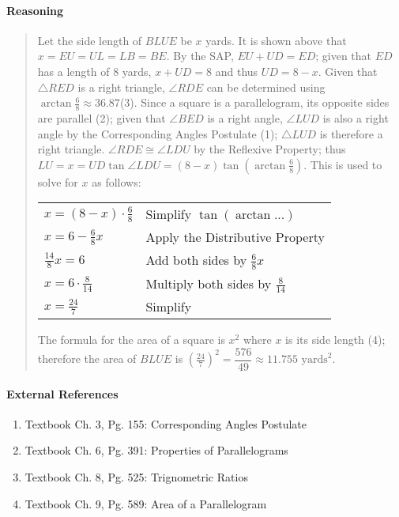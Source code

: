 \documentclass[letterpaper,12pt,twoside]{report}
\begin{document}
	\paragraph{Reasoning}
	\begin{quotation}
		
		Let the side length of $BLUE$ be $x$ yards. It is shown above that $x=EU=UL=LB=BE$. By the SAP, $EU+UD=ED$; given that $ED$ has a length of 8 yards, $x+UD=8$ and thus $UD=8-x$. Given that $\triangle RED$ is a right triangle, $\angle RDE$ can be determined using $\arctan \frac{6}{8} \approx 36.87$\textdegree (3). Since a square is a parallelogram, its opposite sides are parallel (2); given that $\angle BED$ is a right angle, $\angle LUD$ is also a right angle by the Corresponding Angles Postulate (1); $\triangle LUD$ is therefore a right triangle. $\angle RDE \cong \angle LDU$ by the Reflexive Property; thus $LU=x=UD \tan \angle LDU=(8-x)\tan (\arctan \frac{6}{8})$. This is used to solve for $x$ as follows:
		
		\begin{center}
			\begin{tabular}{l | l}
				$x=(8-x) \cdot \frac{6}{8}$ & Simplify $\tan(\arctan ...)$ \\
				$x=6-\frac{6}{8}x$ & Apply the Distributive Property \\
				$\frac{14}{8}x=6$ & Add both sides by $\frac{6}{8}x$ \\
				$x=6 \cdot \frac{8}{14}$ & Multiply both sides by $\frac{8}{14}$ \\
				$x=\frac{24}{7}$ & Simplify
			\end{tabular}
		\end{center}
		
		The formula for the area of a square is $x^2$ where $x$ is its side length (4); therefore the area of $BLUE$ is $(\frac{24}{7})^2=\boxed{\dfrac{576}{49} \approx 11.755 \text{  yards}^2}$.
	\end{quotation}
	
	\paragraph{External References}
	
	\begin{enumerate}
		\item Textbook Ch. 3, Pg. 155: Corresponding Angles Postulate
		\item Textbook Ch. 6, Pg. 391: Properties of Parallelograms
		\item Textbook Ch. 8, Pg. 525: Trignometric Ratios
		\item Textbook Ch. 9, Pg. 589: Area of a Parallelogram
	\end{enumerate}
	
\end{document}
